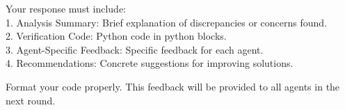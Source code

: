\begin{tcolorbox}[
    breakable,
    colback=white,
    colframe=black,
    boxrule=0.8pt,
    left=6pt,
    right=6pt,
    top=6pt,
    bottom=6pt
]
\vspace{0.25em}
Your response must include:\\
1. Analysis Summary: Brief explanation of discrepancies or concerns found.\\
2. Verification Code: Python code in python blocks.\\
3. Agent-Specific Feedback: Specific feedback for each agent.\\
4. Recommendations: Concrete suggestions for improving solutions.

\vspace{0.5em}
Format your code properly. This feedback will be provided to all agents in the next round.
\end{tcolorbox}
\label{fig:prompt_verification}
